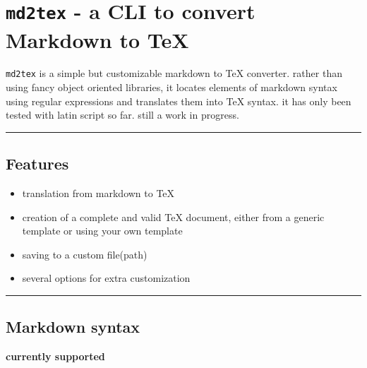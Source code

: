 \documentclass[a4paper, 12pt, twoside]{article}
\begin{document}
\section{\texttt{md2tex} - a CLI to convert Markdown to TeX}

\texttt{md2tex} is a simple but customizable markdown to TeX converter. rather than using fancy object oriented 
libraries, it locates elements of markdown syntax using regular expressions and translates them into TeX syntax.
it has only been tested with latin script so far. still a work in progress.

\par\noindent\rule{\linewidth}{0.4pt}
\subsection{Features}

\begin{itemize}
\item translation from markdown to TeX
\item creation of a complete and valid TeX document, either from a generic template or using your own template
\item saving to a custom file(path)
\item several options for extra customization 
\end{itemize}

\par\noindent\rule{\linewidth}{0.4pt}
\subsection{Markdown syntax}

\textbf{currently supported}
\end{document}
